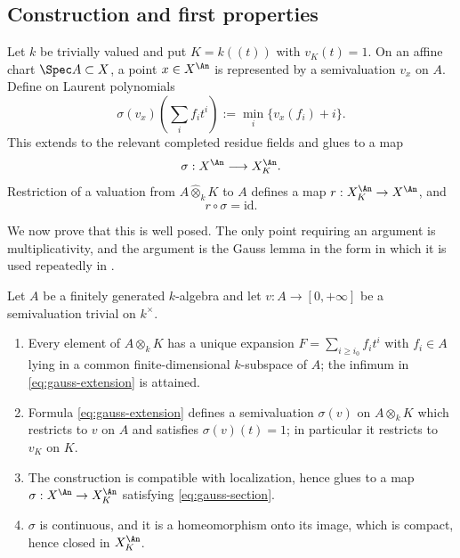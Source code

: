 \subsection{Construction and first properties}
\label{sec:ch30-gauss-construction}

Let \(k\) be trivially valued and put \(K=k((t))\) with \(v_K(t)=1\).  On an
affine chart \(\Spec A\subset X\), a point \(x\in X^{\An}\) is represented
by a semivaluation \(v_x\) on \(A\).  Define on Laurent polynomials
\begin{equation}
\label{eq:gauss-extension}
 \sigma(v_x)\left(\sum_i f_it^i\right)
       :=\min_i\{v_x(f_i)+i\}.
\end{equation}
This extends to the relevant completed residue fields and glues to a map
\[
              \sigma:X^{\An}\longrightarrow X_K^{\An}.
\]
Restriction of a valuation from \(A\widehat\otimes_kK\) to \(A\) defines a
map \(r:X_K^{\An}\to X^{\An}\), and
\begin{equation}
\label{eq:gauss-section}
                              r\circ\sigma=\mathrm{id}.
\end{equation}

We now prove that this is well posed.  The only point requiring an argument
is multiplicativity, and the argument is the Gauss lemma in the form in
which it is used repeatedly in .

\begin{theorem}
\label{thm:ch30-gauss-well-defined}
Let \(A\) be a finitely generated \(k\)-algebra and let
\(v:A\to[0,+\infty]\) be a semivaluation trivial on \(k^\times\).
\begin{enumerate}
\item\label{itm:ch30-gw:expansion}
Every element of \(A\otimes_kK\) has a unique expansion
\(F=\sum_{i\geq i_0}f_it^i\) with \(f_i\in A\) lying in a common
finite-dimensional \(k\)-subspace of \(A\); the infimum in
\eqref{eq:gauss-extension} is attained.
\item\label{itm:ch30-gw:semival}
Formula \eqref{eq:gauss-extension} defines a semivaluation
\(\sigma(v)\) on \(A\otimes_kK\) which restricts to \(v\) on \(A\) and
satisfies \(\sigma(v)(t)=1\); in particular it restricts to \(v_K\) on
\(K\).
\item\label{itm:ch30-gw:glue}
The construction is compatible with localization, hence glues to a map
\(\sigma:X^{\An}\to X_K^{\An}\) satisfying \eqref{eq:gauss-section}.
\item\label{itm:ch30-gw:cont}
\(\sigma\) is continuous, and it is a homeomorphism onto its image, which is
compact, hence closed in \(X_K^{\An}\).
\end{enumerate}
\end{theorem}

